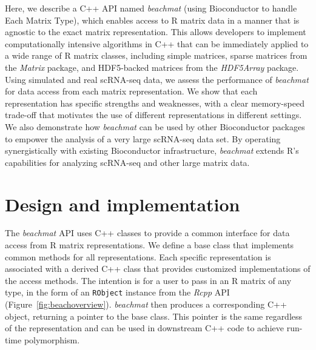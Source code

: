 \documentclass[10pt,letterpaper]{article}
\newcommand{\beachmat}{\textit{beachmat}}
\newcommand{\code}[1]{\texttt{#1}}
\begin{document}

Here, we describe a C++ API named \beachmat{} (using Bioconductor to handle Each Matrix Type), which enables access to R matrix data in a manner that is agnostic to the exact matrix representation.
This allows developers to implement computationally intensive algorithms in C++ that can be immediately applied to a wide range of R matrix classes, including simple matrices, sparse matrices from the \textit{Matrix} package, and HDF5-backed matrices from the \textit{HDF5Array} package.
Using simulated and real scRNA-seq data, we assess the performance of \beachmat{} for data access from each matrix representation.
We show that each representation has specific strengths and weaknesses, with a clear memory-speed trade-off that motivates the use of different representations in different settings.
We also demonstrate how \beachmat{} can be used by other Bioconductor packages to empower the analysis of a very large scRNA-seq data set. 
By operating synergistically with existing Bioconductor infrastructure, \beachmat{} extends R's capabilities for analyzing scRNA-seq and other large matrix data.

\section*{Design and implementation}
The \beachmat{} API uses C++ classes to provide a common interface for data access from R matrix representations.
We define a base class that implements common methods for all representations.
Each specific representation is associated with a derived C++ class that provides customized implementations of the access methods.
The intention is for a user to pass in an R matrix of any type, in the form of an \code{RObject} instance from the \textit{Rcpp} API (Figure~\ref{fig:beachoverview}).
\beachmat{} then produces a corresponding C++ object, returning a pointer to the base class.
This pointer is the same regardless of the representation and can be used in downstream C++ code to achieve run-time polymorphism.
\end{document}
